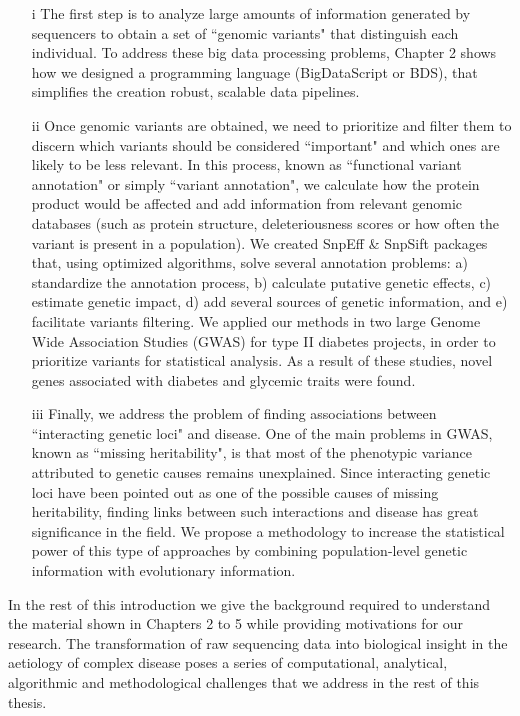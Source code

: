 \begin{itemize}

\item[i] The first step is to analyze large amounts of information generated by sequencers to obtain a set of ``genomic variants" that distinguish each individual. To address these big data processing problems, Chapter 2 shows how we designed a programming language (BigDataScript or BDS), that simplifies the creation robust, scalable data pipelines.

\item[ii] Once genomic variants are obtained, we need to prioritize and filter them to discern which variants should be considered ``important" and which ones are likely to be less relevant. In this process, known as ``functional variant annotation" or simply ``variant annotation", we calculate how the protein product would be affected and add information from relevant genomic databases (such as protein structure, deleteriousness scores or how often the variant is present in a population). We created SnpEff \& SnpSift \cite{cingolani2012program, cingolani2012using} packages that, using optimized algorithms, solve several annotation problems: a) standardize the annotation process, b) calculate putative genetic effects, c) estimate genetic impact, d) add several sources of genetic information, and e) facilitate variants filtering. We applied our methods in two large Genome Wide Association Studies (GWAS) for type II diabetes projects, in order to prioritize variants for statistical analysis. As a result of these studies, novel genes associated with diabetes and glycemic traits were found.
					
\item[iii] Finally, we address the problem of finding associations between ``interacting genetic loci" and disease. One of the main problems in GWAS, known as ``missing heritability", is that most of the phenotypic variance attributed to genetic causes remains unexplained. Since interacting genetic loci have been pointed out as one of the possible causes of missing heritability, finding links between such interactions and disease has great significance in the field. We propose a methodology to increase the statistical power of this type of approaches by combining population-level genetic information with evolutionary information. 

\end{itemize}

In the rest of this introduction we give the background required to understand the material shown in Chapters 2 to 5 while providing motivations for our research. The transformation of raw sequencing data into biological insight in the aetiology of complex disease poses a series of computational, analytical, algorithmic and methodological challenges that we address in the rest of this thesis.

